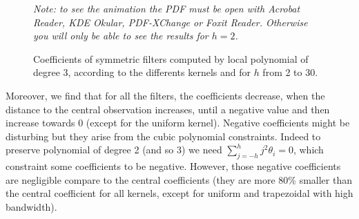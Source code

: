 \documentclass[
  12pt,
  ,
  a4paper]{article}
\newcommand\1{\mathds{1}}
\begin{document}
\begin{figure}[!ht]
\caption{Coefficients of symmetric filters computed by local polynomial of degree $3$, according to the differents kernels and for $h$ from 2 to 30.}\label{fig:filterscoefs}\footnotesize
\emph{Note: to see the animation the PDF must be open with Acrobat Reader, KDE Okular, PDF-XChange or Foxit Reader.
Otherwise you will only be able to see the results for $h=2$.}
\end{figure}

Moreover, we find that for all the filters, the coefficients decrease, when the distance to the central observation increases, until a negative value and then increase towards 0 (except for the uniform kernel).
Negative coefficients might be disturbing but they arise from the cubic polynomial constraints.
Indeed to preserve polynomial of degree 2 (and so 3) we need \(\sum_{j=-h}^hj^2\theta_i=0\), which constraint some coefficients to be negative.
However, those negative coefficients are negligible compare to the central coefficients (they are more 80\% smaller than the central coefficient for all kernels, except for uniform and trapezoidal with high bandwidth).
\end{document}
